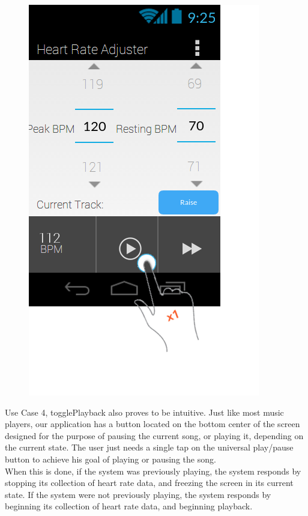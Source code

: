 \documentclass[letterpaper,english, 12pt]{scrreprt}
\begin{document}
\begin{figure}[H]
	\centering
	\includegraphics{img/Prelim_Design/PrelimDesign_3.png}\\
\end{figure}

Use Case 4, togglePlayback also proves to be intuitive. Just like most music players, our application has a button located on the bottom center of the screen designed for the purpose of pausing the current song, or playing it, depending on the current state. The user just needs a single tap on the universal play/pause button to achieve his goal of playing or pausing the song.\\

When this is done, if the system was previously playing, the system responds by stopping its collection of heart rate data, and freezing the screen in its current state. 
If the system were not previously playing, the system responds by beginning its collection of heart rate data, and beginning playback.
\end{document}

